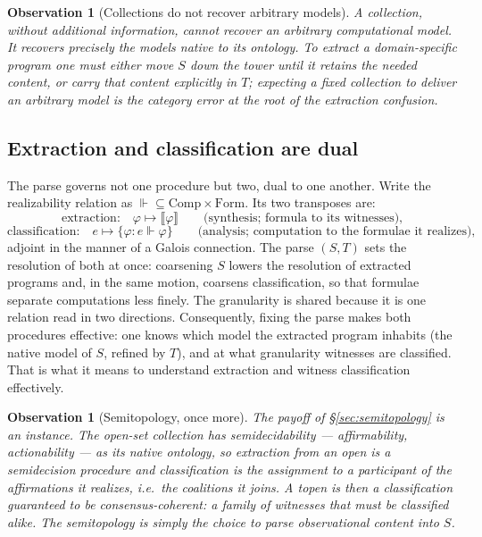 \documentclass[11pt]{article}
\theoremstyle{definition}
\theoremstyle{plain}
\newtheorem{observation}[definition]{Observation}
\newcommand{\T}{T}
\newcommand{\Coll}{S}
\newcommand{\sem}[1]{\llbracket #1 \rrbracket}
\newcommand{\real}{\Vdash}
\begin{document}
\begin{observation}[Collections do not recover arbitrary models]
\label{obs:extract}
A collection, without additional information, cannot recover an arbitrary
computational model. It recovers precisely the models native to its ontology.
To extract a domain-specific program one must either move $\Coll$ down the
tower until it retains the needed content, or carry that content explicitly in
$\T$; expecting a fixed collection to deliver an arbitrary model is the
category error at the root of the extraction confusion.
\end{observation}

\subsection{Extraction and classification are dual}

The parse governs not one procedure but two, dual to one another. Write the
realizability relation as ${\real}\subseteq \mathrm{Comp}\times\mathrm{Form}$.
Its two transposes are:
\[
  \text{extraction:}\quad \varphi \longmapsto \sem{\varphi}
  \qquad\text{(synthesis; formula to its witnesses),}
\]
\[
  \text{classification:}\quad e \longmapsto \{\varphi : e \real \varphi\}
  \qquad\text{(analysis; computation to the formulae it realizes),}
\]
adjoint in the manner of a Galois connection. The parse $(\Coll,\T)$ sets the
resolution of both at once: coarsening $\Coll$ lowers the resolution of
extracted programs and, in the same motion, coarsens classification, so that
formulae separate computations less finely. The granularity is shared because
it is one relation read in two directions. Consequently, fixing the parse makes
both procedures effective: one knows which model the extracted program inhabits
(the native model of $\Coll$, refined by $\T$), and at what granularity
witnesses are classified. That is what it means to understand extraction and
witness classification effectively.

\begin{observation}[Semitopology, once more]
\label{obs:coda-semi}
The payoff of \S\ref{sec:semitopology} is an instance. The open-set collection
has semidecidability --- affirmability, actionability --- as its native
ontology, so extraction from an open is a semidecision procedure and
classification is the assignment to a participant of the affirmations it
realizes, i.e.\ the coalitions it joins. A topen is then a classification
guaranteed to be consensus-coherent: a family of witnesses that must be
classified alike. The semitopology is simply the choice to parse observational
content into $\Coll$.
\end{observation}
\end{document}
